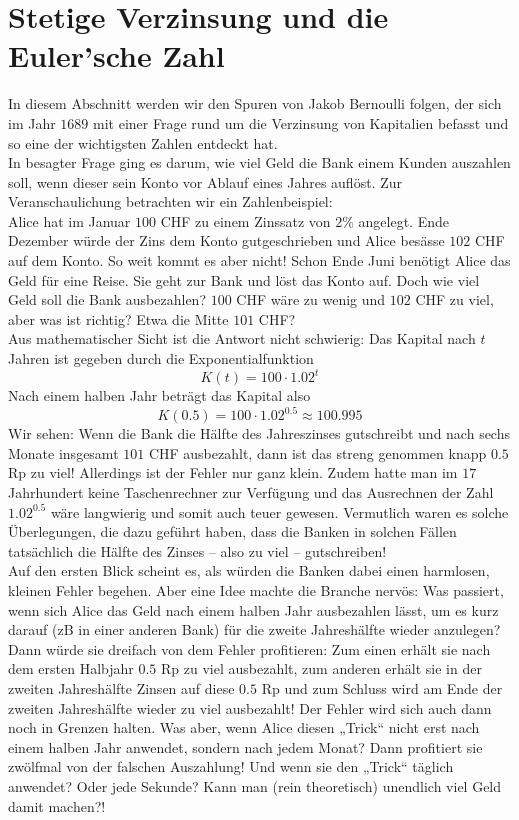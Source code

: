 \documentclass[11pt,oneside]{article}
\begin{document}
\section{Stetige Verzinsung und die Euler'sche Zahl}
	In diesem Abschnitt werden wir den Spuren von Jakob Bernoulli folgen, der sich im Jahr $1689$ mit einer Frage rund um die Verzinsung von Kapitalien befasst und so eine der wichtigsten Zahlen entdeckt hat.\vspace{16pt}\\
	In besagter Frage ging es darum, wie viel Geld die Bank einem Kunden auszahlen soll, wenn dieser sein Konto vor Ablauf eines Jahres auflöst. Zur Veranschaulichung betrachten wir ein Zahlenbeispiel:\\
	Alice hat im Januar $100$ CHF zu einem Zinssatz von $2\%$ angelegt. Ende Dezember würde der Zins dem Konto gutgeschrieben und Alice besässe $102$ CHF auf dem Konto. So weit kommt es aber nicht! Schon Ende Juni benötigt Alice das Geld für eine Reise. Sie geht zur Bank und löst das Konto auf. Doch wie viel Geld soll die Bank ausbezahlen? $100$ CHF wäre zu wenig und $102$ CHF zu viel, aber was ist richtig? Etwa die Mitte $101$ CHF?\vspace{16pt}\\
	Aus mathematischer Sicht ist die Antwort nicht schwierig: Das Kapital nach $t$ Jahren ist gegeben durch die Exponentialfunktion
	\[K(t)=100\cdot 1.02^t\]
	Nach einem halben Jahr beträgt das Kapital also
	\[K(0.5)=100\cdot 1.02^{0.5}\approx100.995\]
	Wir sehen: Wenn die Bank die Hälfte des Jahreszinses gutschreibt und nach sechs Monate insgesamt $101$ CHF ausbezahlt, dann ist das streng genommen knapp $0.5$ Rp zu viel! Allerdings ist der Fehler nur ganz klein. Zudem hatte man im $17$ Jahrhundert keine Taschenrechner zur Verfügung und das Ausrechnen der Zahl $1.02^{0.5}$ wäre langwierig und somit auch teuer gewesen. Vermutlich waren es solche Überlegungen, die dazu geführt haben, dass die Banken in solchen Fällen tatsächlich die Hälfte des Zinses – also zu viel – gutschreiben!\vspace{16pt}\\
	Auf den ersten Blick scheint es, als würden die Banken dabei einen harmlosen, kleinen Fehler begehen. Aber eine Idee machte die Branche nervös: Was passiert, wenn sich Alice das Geld nach einem halben Jahr ausbezahlen lässt, um es kurz darauf (zB in einer anderen Bank) für die zweite Jahreshälfte wieder anzulegen? Dann würde sie dreifach von dem Fehler profitieren: Zum einen erhält sie nach dem ersten Halbjahr $0.5$ Rp zu viel ausbezahlt, zum anderen erhält sie in der zweiten Jahreshälfte Zinsen auf diese $0.5$ Rp und zum Schluss wird am Ende der zweiten Jahreshälfte wieder zu viel ausbezahlt! Der Fehler wird sich auch dann noch in Grenzen halten. Was aber, wenn Alice diesen „Trick“ nicht erst nach einem halben Jahr anwendet, sondern nach jedem Monat? Dann profitiert sie zwölfmal von der falschen Auszahlung! Und wenn sie den „Trick“ täglich anwendet? Oder jede Sekunde? Kann man (rein theoretisch) unendlich viel Geld damit machen?!\vspace{16pt}\\
\end{document}
